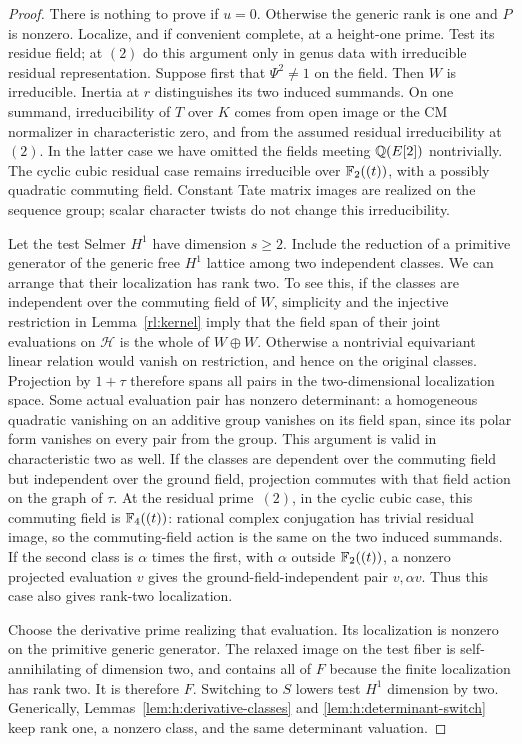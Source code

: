 \begin{proof}
There is nothing to prove if $u=0$. Otherwise the generic rank is one
and $P$ is nonzero. Localize, and if convenient complete, at a
height-one prime. Test its
residue field; at $(2)$ do this argument only in genus data with
irreducible residual representation. Suppose first that $\Psi^2\ne1$
on the field. Then $W$ is irreducible. Inertia at $r$ distinguishes its
two induced summands. On one summand, irreducibility of $T$ over $K$
comes from open image or the CM normalizer in characteristic zero, and
from the assumed residual irreducibility at $(2)$. In the latter case
we have omitted the fields meeting $\mathbb Q(E[2])$ nontrivially. The cyclic
cubic residual case remains irreducible over $\mathbb F_2((t))$, with a
possibly quadratic commuting field. Constant Tate matrix images are
realized on the sequence group; scalar character twists do not change
this irreducibility.

Let the test Selmer $H^1$ have dimension $s\ge2$. Include the reduction of
a primitive generator of the generic free $H^1$ lattice among two
independent classes. We can arrange that their localization has rank
two. To see this, if the classes are independent over the commuting
field of $W$, simplicity and the injective restriction in
Lemma~\ref{rl:kernel} imply that the field span of their joint
evaluations on $\mathcal H$ is the whole of $W\oplus W$. Otherwise
a nontrivial equivariant linear relation would vanish on restriction,
and hence on the original classes. Projection by $1+\tau$ therefore
spans all pairs in the two-dimensional localization space. Some actual
evaluation pair has nonzero determinant: a homogeneous quadratic
vanishing on an additive group vanishes on its field span, since its
polar form vanishes on every pair from the group. This argument is
valid in characteristic two as well. If the classes are dependent over
the commuting field but independent over the ground field, projection
commutes with that field action on the graph of $\tau$. At the residual
prime~$(2)$, in the cyclic cubic case, this commuting field is
$\mathbb F_4((t))$: rational complex
conjugation has trivial residual image, so the commuting-field action
is the same on the two induced summands. If the second class is $\alpha$ times the first, with
$\alpha$ outside $\mathbb F_2((t))$, a nonzero projected evaluation $v$ gives
the ground-field-independent pair $v,\alpha v$. Thus this case also
gives rank-two localization.

Choose the derivative prime realizing that evaluation. Its localization
is nonzero on the primitive generic generator. The relaxed image on the
test fiber is self-annihilating of dimension two, and contains all of
$F$ because the finite localization has rank two. It is therefore $F$.
Switching to $S$ lowers test $H^1$ dimension by two. Generically,
Lemmas~\ref{lem:h:derivative-classes} and
\ref{lem:h:determinant-switch} keep rank one, a nonzero class, and the
same determinant valuation.


\end{proof}
